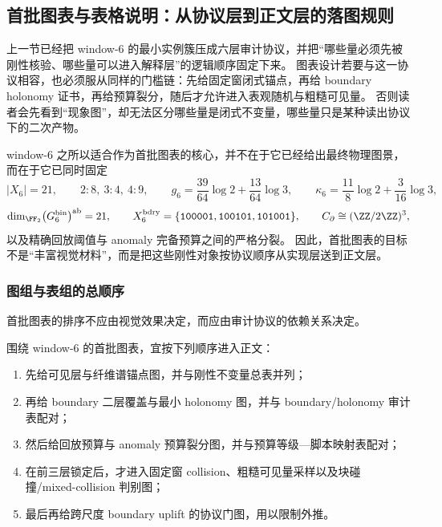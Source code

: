 \subsection{首批图表与表格说明：从协议层到正文层的落图规则}\label{subsec:typed-address-biaxial-completion-window6-figure-table-guidelines}
上一节已经把 window-\(6\) 的最小实例簇压成六层审计协议，并把“哪些量必须先被刚性核验、哪些量可以进入解释层”的逻辑顺序固定下来。
图表设计若要与这一协议相容，也必须服从同样的门槛链：先给固定窗闭式锚点，再给 boundary holonomy 证书，再给预算裂分，随后才允许进入表观随机与粗糙可见量。
否则读者会先看到“现象图”，却无法区分哪些量是闭式不变量，哪些量只是某种读出协议下的二次产物。

window-\(6\) 之所以适合作为首批图表的核心，并不在于它已经给出最终物理图景，而在于它已同时固定
\[
|X_6|=21,
\qquad
2{:}8,\ 3{:}4,\ 4{:}9,
\qquad
g_6=\frac{39}{64}\log 2+\frac{13}{64}\log 3,
\qquad
\kappa_6=\frac{11}{8}\log 2+\frac{3}{16}\log 3,
\]
\[
\dim_{\FF_2}\bigl(G_6^{\mathrm{bin}}\bigr)^{\mathrm{ab}}=21,
\qquad
X_6^{\mathrm{bdry}}=\{\texttt{100001},\texttt{100101},\texttt{101001}\},
\qquad
C_{\partial}\cong (\ZZ/2\ZZ)^3,
\]
以及精确回放阈值与 anomaly 完备预算之间的严格分裂。
因此，首批图表的目标不是“丰富视觉材料”，而是把这些刚性对象按协议顺序从实现层送到正文层。

\subsubsection{图组与表组的总顺序}\label{subsubsec:typed-address-biaxial-completion-window6-figure-table-order}
首批图表的排序不应由视觉效果决定，而应由审计协议的依赖关系决定。

\begin{proposition}[首批图表与表格的落图顺序]\label{prop:typed-address-biaxial-completion-window6-figure-table-order}
围绕 window-\(6\) 的首批图表，宜按下列顺序进入正文：
\begin{enumerate}
  \item 先给可见层与纤维谱锚点图，并与刚性不变量总表并列；
  \item 再给 boundary 二层覆盖与最小 holonomy 图，并与 boundary/holonomy 审计表配对；
  \item 然后给回放预算与 anomaly 预算裂分图，并与预算等级—脚本映射表配对；
  \item 在前三层锁定后，才进入固定窗 collision、粗糙可见量采样以及块碰撞/mixed-collision 判别图；
  \item 最后再给跨尺度 boundary uplift 的协议门图，用以限制外推。
\end{enumerate}
\end{proposition}

